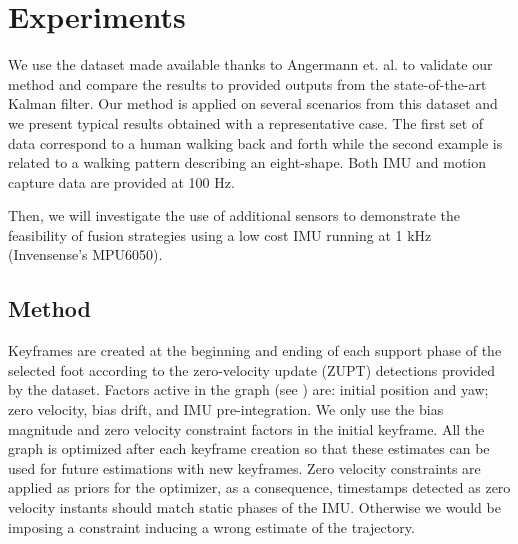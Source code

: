 
\section{Experiments} \label{sec:experiments}

We use the dataset made available thanks to Angermann et. al. \cite{angermann2010high} to validate our method and compare the results to provided outputs from the state-of-the-art Kalman filter.
Our method is applied on several scenarios from this dataset and we present typical results obtained with a representative case. 
The first set of data correspond to a human walking back and forth 
while the second example is related to a walking pattern describing an eight-shape. 
Both IMU and motion capture data are provided at 100 Hz.

Then, we will investigate the use of additional sensors to demonstrate the feasibility of fusion strategies using a low cost IMU running at 1 kHz (Invensense's MPU6050).


\subsection{Method}

Keyframes are created at the beginning and ending of each support phase of the selected foot according to the zero-velocity update (ZUPT) detections provided by the dataset. Factors active in the graph (see ) are: initial position and yaw; zero velocity, bias drift, and IMU pre-integration. We only use the bias magnitude 
and zero velocity constraint factors in the initial keyframe. All the graph is optimized after each keyframe creation so that these estimates can be used for future estimations with new keyframes. Zero velocity constraints are applied 
as priors for the optimizer, as a consequence, timestamps detected as zero velocity instants should match static phases of the IMU. 
Otherwise we would be imposing a constraint inducing a wrong estimate of the trajectory.

